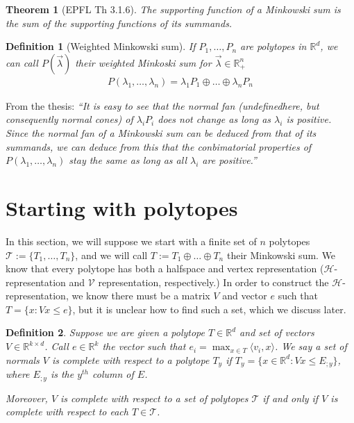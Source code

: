 \documentclass[12pt]{article}
\newcommand{\reals}{\mathbb{R}}
\renewcommand{\H}{\mathcal{H}}
\newcommand{\T}{\mathcal{T}}
\newcommand{\V}{\mathcal{V}}
\newcommand{\inprod}[2]{\langle #1, #2 \rangle}%
\newtheorem{theorem}{Theorem}
\newtheorem{definition}{Definition}
\begin{document}
\begin{theorem}[EPFL Th 3.1.6]\label{thm:support-minksum}
  The supporting function of a Minkowski sum is the sum of the supporting functions of its summands.
\end{theorem}

\begin{definition}[Weighted Minkowski sum]
  If $P_1, \ldots, P_n$ are polytopes in $\reals^d$, we can call $P(\vec \lambda)$ their \emph{weighted} Minkoski sum for $\vec \lambda \in \reals^n_+$
  \begin{align*}
    P(\lambda_1, \ldots, \lambda_n) = \lambda_1 P_1 \oplus \ldots \oplus \lambda_n P_n
  \end{align*}
\end{definition}

  From the thesis:  \emph{``It is easy to see that the normal fan (undefinedhere, but consequently normal cones) of $\lambda_i P_i$ does not change as long as $\lambda_i$ is positive.  Since the normal fan of a Minkowski sum can be deduced from that of its summands, we can deduce from this that the conbimatorial properties of $P(\lambda_1, \ldots, \lambda_n)$ stay the same as long as all $\lambda_i$ are positive.''}

  \section{Starting with polytopes}\label{sec:start-polytope}
  In this section, we will suppose we start with a finite set of $n$ polytopes $\T := \{T_1, \ldots, T_n\}$, and we will call $T := T_1 \oplus \ldots \oplus T_n$ their Minkowski sum.
  We know that every polytope has both a halfspace and vertex representation ($\H$-representation and $\V$ representation, respectively.)
  In order to construct the $\H$-representation, we know there must be a matrix $V$ and vector $e$ such that $T = \{x : Vx \leq e\}$, but it is unclear how to find such a set, which we discuss later.

  \begin{definition}
    Suppose we are given a polytope $T \in \reals^d$ and set of vectors $V \in \reals^{k \times d}$.
    Call $e \in \reals^k$ the vector such that $e_i = \max_{x \in T}\inprod{v_i}{x}$.  
    We say a set of normals $V$ is \emph{complete} with respect to a polytope $T_y$ if $T_y = \{x \in \reals^d: Vx \leq E_{;y}\}$, where $E_{;y}$ is the $y^{th}$ column of $E$.

    Moreover, $V$ is complete with respect to a set of polytopes $\T$ if and only if $V$ is complete with respect to each $T \in \T$.
  \end{definition}
\end{document}
